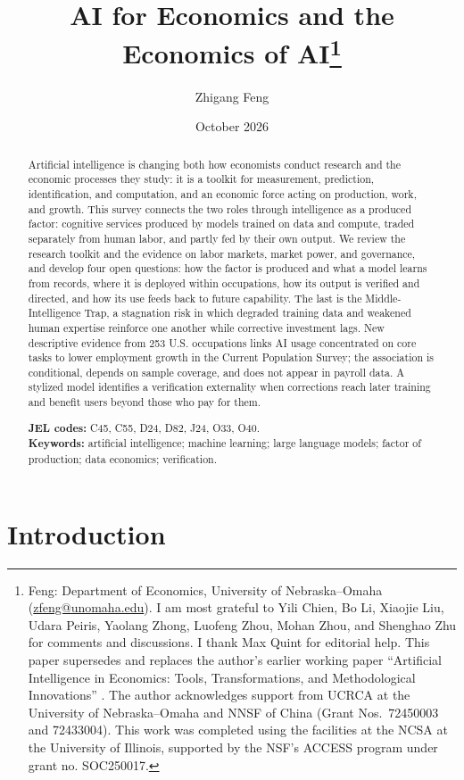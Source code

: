 \documentclass[12pt]{article}
\title{AI for Economics and the Economics of AI\thanks{%
Feng: Department of Economics, University of Nebraska--Omaha
(\href{mailto:zfeng@unomaha.edu}{zfeng@unomaha.edu}).
I am most grateful to Yili Chien, Bo Li, Xiaojie Liu, Udara Peiris, Yaolang Zhong, Luofeng Zhou, Mohan Zhou, and Shenghao Zhu for comments and discussions. I thank Max Quint for editorial help. This paper supersedes and replaces the author's earlier working paper
``Artificial Intelligence in Economics: Tools, Transformations, and
Methodological Innovations'' \citep{Feng2025AIEcon}.
The author acknowledges support from UCRCA at the University of
Nebraska--Omaha and NNSF of China (Grant Nos.~72450003 and 72433004). This work was completed using the facilities at the
NCSA at the University of Illinois, supported by the NSF's ACCESS program under grant no. SOC250017.
}}
\author{Zhigang Feng}
\date{October 2026}
\theoremstyle{plain}
\theoremstyle{definition}
\theoremstyle{remark}
\begin{document}
\maketitle

\begin{abstract}
\noindent
Artificial intelligence is changing both how economists conduct
research and the economic processes they study: it is a toolkit for
measurement, prediction, identification, and computation, and an
economic force acting on production, work, and growth. This survey
connects the two roles through intelligence as a produced factor:
cognitive services produced by models trained on data and compute,
traded separately from human labor, and partly fed by their own output.
We review the research toolkit and the evidence on labor markets,
market power, and governance, and develop four open questions: how the
factor is produced and what a model learns from records, where it is
deployed within occupations, how its output is verified and directed,
and how its use feeds back to future capability. The last is the
Middle-Intelligence Trap, a stagnation risk in which degraded training
data and weakened human expertise reinforce one another while
corrective investment lags. New descriptive evidence from 253 U.S.
occupations links AI usage concentrated on core tasks to lower
employment growth in the Current Population Survey; the association is
conditional, depends on sample coverage, and does not appear in payroll
data. A stylized model identifies a verification externality when
corrections reach later training and benefit users beyond those who pay
for them.

\medskip

\noindent\textbf{JEL codes:} C45, C55, D24, D82, J24, O33, O40.\\
\textbf{Keywords:} artificial intelligence; machine learning; large language
models; factor of production; data economics; verification.
\end{abstract}

\newpage

\section{Introduction}
\end{document}

